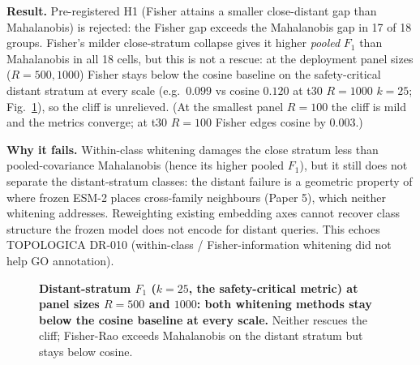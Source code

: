 \documentclass[11pt]{article}
\begin{document}
\textbf{Result.} Pre-registered H1 (Fisher attains a smaller close-distant gap than Mahalanobis) is rejected: the Fisher gap exceeds the Mahalanobis gap in 17 of 18 groups. Fisher's milder close-stratum collapse gives it higher \emph{pooled} $F_1$ than Mahalanobis in all 18 cells, but this is not a rescue: at the deployment panel sizes ($R{=}500,1000$) Fisher stays below the cosine baseline on the safety-critical distant stratum at every scale (e.g.\ $0.099$ vs cosine $0.120$ at t30 $R{=}1000$ $k{=}25$; Fig.~\ref{fig:whitening}), so the cliff is unrelieved. (At the smallest panel $R{=}100$ the cliff is mild and the metrics converge; at t30 $R{=}100$ Fisher edges cosine by $0.003$.)

\textbf{Why it fails.} Within-class whitening damages the close stratum less than pooled-covariance Mahalanobis (hence its higher pooled $F_1$), but it still does not separate the distant-stratum classes: the distant failure is a geometric property of where frozen ESM-2 places cross-family neighbours (Paper 5), which neither whitening addresses. Reweighting existing embedding axes cannot recover class structure the frozen model does not encode for distant queries. This echoes TOPOLOGICA DR-010 (within-class / Fisher-information whitening did not help GO annotation).

\begin{figure}[h]\centering
{}
\caption{\textbf{Distant-stratum $F_1$ ($k=25$, the safety-critical metric) at panel sizes $R{=}500$ and $1000$: both whitening methods stay below the cosine baseline at every scale.} Neither rescues the cliff; Fisher-Rao exceeds Mahalanobis on the distant stratum but stays below cosine.}
\label{fig:whitening}
\end{figure}
\end{document}
